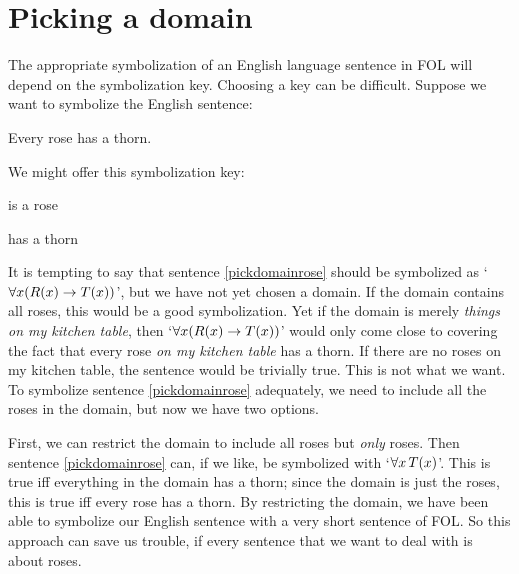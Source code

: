 \section{Picking a domain}
The appropriate symbolization of an English language sentence in FOL will depend on the symbolization key. Choosing a key can be difficult. Suppose we want to symbolize the English sentence:
	\begin{earg}
		\item[\ex{pickdomainrose}] Every rose has a thorn.
	\end{earg}
We might offer this symbolization key:
	\begin{ekey}
		\item[\atom{R}{x}]  is a rose
		\item[\atom{T}{x}]  has a thorn
	\end{ekey}
It is tempting to say that sentence \ref{pickdomainrose} should be symbolized as `$\forall x(\mathord{R}(x) \rightarrow \mathord{T}(x))$', but we have not yet chosen a domain. If the domain contains all roses, this would be a good symbolization. Yet if the domain is merely \emph{things on my kitchen table}, then `$\forall x(\mathord{R}(x) \rightarrow \mathord{T}(x))$' would only come close to covering the fact that every rose \emph{on my kitchen table} has a thorn. If there are no roses on my kitchen table, the sentence would be trivially true. This is not what we want. To symbolize sentence \ref{pickdomainrose} adequately, we need to include all the roses in the domain, but now we have two options. 

First, we can restrict the domain to include all roses but \emph{only} roses. Then sentence \ref{pickdomainrose} can, if we like, be symbolized with `$\forall x\,\mathord{T}(x)$'. This is true iff everything in the domain has a thorn; since the domain is just the roses, this is true iff every rose has a thorn. By restricting the domain, we have been able to symbolize our English sentence with a very short sentence of FOL. So this approach can save us trouble, if every sentence that we want to deal with is about roses.

